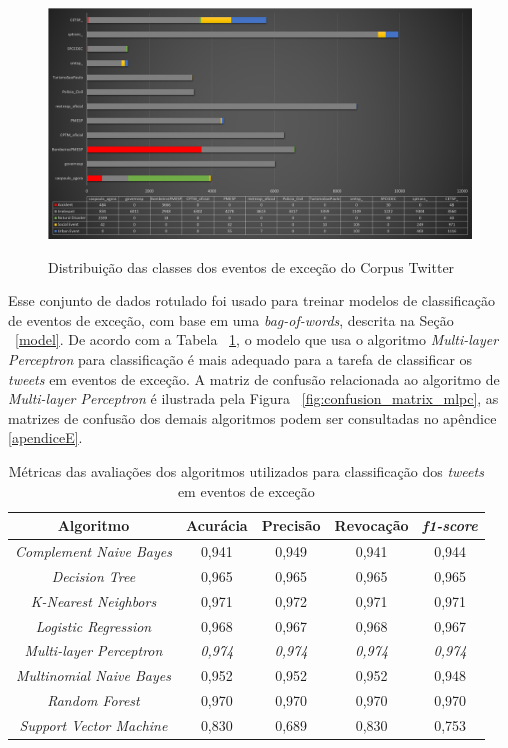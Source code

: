\documentclass[
	12pt,				%
	oneside,			%
	a4paper,			%
	english,			%
	brazil				%
	]{abntex2ppgsi}
\begin{document}
\begin{figure}[!htb]
	\centering
 	  \caption{Distribuição das classes dos eventos de exceção do Corpus Twitter}
		\includegraphics[width=1\linewidth]{images/tweets_distribution.png}
	\label{fig:tweets_distribution}
\end{figure}

Esse conjunto de dados rotulado foi usado para treinar modelos de classificação de eventos de exceção, com base em uma \textit{bag-of-words}, descrita na Seção ~\ref{model}. De acordo com a Tabela ~\ref{tab:metrics}, o modelo que usa o algoritmo \textit{Multi-layer Perceptron} para classificação é mais adequado para a tarefa de classificar os \textit{tweets} em eventos de exceção. A matriz de confusão relacionada ao algoritmo de \textit{Multi-layer Perceptron} é ilustrada pela Figura ~\ref{fig:confusion_matrix_mlpc}, as matrizes de confusão dos demais algoritmos podem ser consultadas no apêndice \ref{apendiceE}.

\begin{table}[!htb]
\centering
\caption {Métricas das avaliações dos algoritmos utilizados para classificação dos \textit{tweets} em eventos de exceção}
\label {tab:metrics}
\begin{tabular}{c|c|c|c|c}
\toprule
\textbf{Algoritmo} & \textbf{Acurácia} & \textbf{Precisão} & \textbf{Revocação} & \textbf{\textit{f1-score}} \\
\midrule
\textit{Complement Naive Bayes} & 0,941 & 0,949 & 0,941 & 0,944 \\
\hline
\textit{Decision Tree} & 0,965 & 0,965 & 0,965 & 0,965 \\
\hline
\textit{K-Nearest Neighbors} & 0,971 & 0,972 & 0,971 & 0,971 \\
\hline
\textit{Logistic Regression} & 0,968 & 0,967 & 0,968 & 0,967 \\
\hline
\textit{Multi-layer Perceptron} & \textit{0,974} & \textit{0,974} & \textit{0,974} & \textit{0,974} \\
\hline
\textit{Multinomial Naive Bayes} & 0,952 & 0,952 & 0,952 & 0,948 \\
\hline
\textit{Random Forest} & 0,970 & 0,970 & 0,970 & 0,970 \\
\hline
\textit{Support Vector Machine} & 0,830 & 0,689 & 0,830 & 0,753 \\
\bottomrule
\end{tabular}
\end{table}
\end{document}
